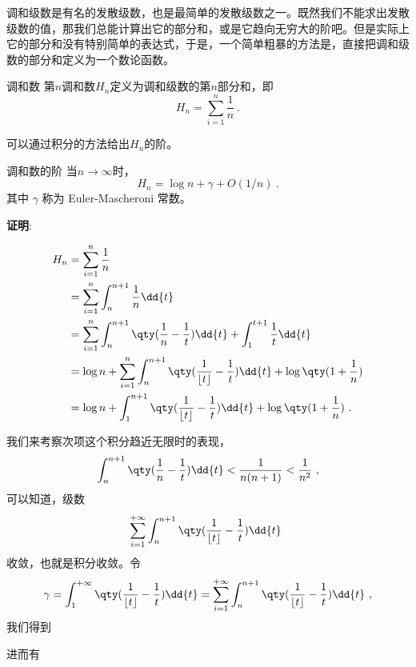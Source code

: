 

调和级数是有名的发散级数，也是最简单的发散级数之一。既然我们不能求出发散级数的值，那我们总能计算出它的部分和，或是它趋向无穷大的阶吧。但是实际上它的部分和没有特别简单的表达式，于是，一个简单粗暴的方法是，直接把调和级数的部分和定义为一个数论函数。

\begin{definition}{调和数}
第$n$调和数$H_n$定义为调和级数的第$n$部分和，即
\begin{equation}
H_n = \sum_{i=1}^n\frac{1}{n}~.
\end{equation}
\end{definition}

可以通过积分的方法给出$H_n$的阶。

\begin{theorem}{调和数的阶}
当$n\to\infty$时，
\begin{equation}
H_n = \log n + \gamma + O(1/n) ~.
\end{equation}
其中 $\gamma$ 称为 Euler-Mascheroni 常数。
\end{theorem}

\textbf{证明}:

\begin{equation}
\begin{aligned}
H_n & = \sum_{i=1}^n\frac{1}{n}\\
& = \sum_{i=1}^n\int_n^{n+1}\frac{1}{n}\dd{t}\\
& = \sum_{i=1}^n\int_n^{n+1}\qty(\frac{1}{n}-\frac{1}{t})\dd{t}+\int_1^{t+1}\frac{1}{t}\dd{t}\\
& = \log n+\sum_{i=1}^n\int_n^{n+1}\qty(\frac{1}{\lfloor t\rfloor}-\frac{1}{t})\dd{t}+\log\qty(1+\frac{1}{n})\\
& = \log n+\int_1^{n+1}\qty(\frac{1}{\lfloor t\rfloor}-\frac{1}{t})\dd{t}+\log\qty(1+\frac{1}{n})~.
\end{aligned}
\end{equation}

我们来考察次项这个积分趋近无限时的表现，
\begin{equation}
\int_n^{n+1}\qty(\frac{1}{n}-\frac{1}{t})\dd{t}<\frac{1}{n(n+1)}<\frac{1}{n^2}~,
\end{equation}
可以知道，级数
\begin{equation}
\sum_{i=1}^{+\infty} \int_n^{n+1}\qty(\frac{1}{\lfloor t\rfloor}-\frac{1}{t})\dd{t}~
\end{equation}
收敛，也就是积分收敛。令
\begin{equation}
\gamma = \int_1^{+\infty} \qty(\frac{1}{\lfloor t\rfloor}-\frac{1}{t})\dd{t} = \sum_{i=1}^{+\infty} \int_n^{n+1}\qty(\frac{1}{\lfloor t\rfloor}-\frac{1}{t})\dd{t}~,
\end{equation}
我们得到
进而有